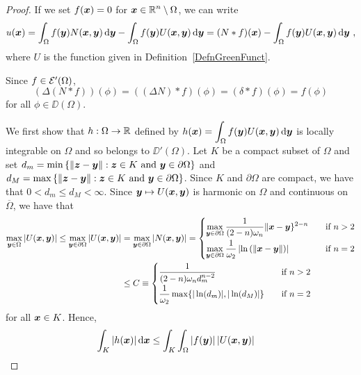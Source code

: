 \begin{proof}
If we set $f({\bm{x}}) = 0$ for
$\displaystyle {\bm{x}} \in \mathbb{R}^n \setminus \Omega$,
we can write
\[
u({\bm{x}}) = \int_{\Omega} f({\bm{y}}) N({\bm{x}},{\bm{y}}) \,\mathrm{d}{{\bm{y}}}
- \int_{\Omega} f({\bm{y}}) U({\bm{x}},{\bm{y}}) \,\mathrm{d}{{\bm{y}}}
= (N\ast f)({\bm{x}}) - \int_{\Omega} f({\bm{y}}) U({\bm{x}},{\bm{y}})
\,\mathrm{d}{{\bm{y}}} \ ,
\]
where $U$ is the function given in Definition~\ref{DefnGreenFunct}.

Since $f \in \mathcal{E}'(\Omega)$,
\[
(\Delta(N\ast f))(\phi) = ((\Delta N) \ast f)(\phi) =
(\delta \ast f)(\phi) = f(\phi)
\]
for all $\phi \in \DD(\Omega)$.

We first show that $h : \Omega \to \mathbb{R}$ defined by
$\displaystyle
h({\bm{x}}) = \int_{\Omega} f({\bm{y}}) U({\bm{x}},{\bm{y}}) \,\mathrm{d}{{\bm{y}}}$
is locally integrable on $\Omega$ and so belongs to $\DD'(\Omega)$.
Let $K$ be a compact subset of $\Omega$ and set
$\displaystyle
d_m = \min \left\{ \|{\bm{z}} - {\bm{y}}\| : {\bm{z}} \in K \ \text{and}
\ {\bm{y}} \in \partial \Omega \right\}$ and
$\displaystyle
d_M = \max \left\{ \|{\bm{z}} - {\bm{y}}\| : {\bm{z}} \in K \ \text{and}
  \ {\bm{y}} \in \partial \Omega \right\}$.  Since $K$ and
$\partial \Omega$ are compact, we have that $0 < d_m \leq d_M < \infty$.
Since ${\bm{y}} \mapsto U({\bm{x}},{\bm{y}})$ is harmonic on $\Omega$ and
continuous on $\overline{\Omega}$, we have that
\begin{align*}
\max_{{\bm{y}} \in \Omega} | U({\bm{x}},{\bm{y}}) |
\leq \max_{{\bm{y}} \in \partial \Omega} | U({\bm{x}},{\bm{y}}) |
&= \max_{{\bm{y}} \in \partial \Omega} | N({\bm{x}},{\bm{y}}) |
= \begin{cases}
\displaystyle \max_{{\bm{y}} \in \partial \Omega}
\frac{1}{(2-n)\omega_n}
\|{\bm{x}}-{\bm{y}}\}^{2-n} & \quad \text{if}\ n > 2 \\[0.8em]
\displaystyle \max_{{\bm{y}} \in \partial \Omega}
\frac{1}{\omega_2} \left|\ln\left(\|{\bm{x}}-{\bm{y}}\|\right) \right|
& \quad \text{if}\ n = 2
\end{cases} \\
&\leq C \equiv
\begin{cases}
\displaystyle \frac{1}{(2-n)\omega_n d_m^{n-2}} & \quad \text{if}\ n > 2
\\[0.8em]
\displaystyle \frac{1}{\omega_2} \max\{ |\ln(d_m)|, |\ln(d_M)| \} &
\quad \text{if}\ n = 2  
\end{cases}
\end{align*}
for all ${\bm{x}} \in K$.  Hence,
\begin{align*}
\int_K |h(\VEC{x})| \dx{\VEC{x}}
&\leq \int_K \int_{\Omega} |f(\VEC{y})|\, |U(\VEC{x},\VEC{y})|

\end{align*}
\end{proof}
